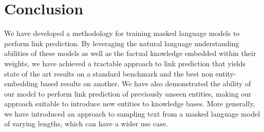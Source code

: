 \documentclass[11pt,a4paper]{article}
\begin{document}
\section{Conclusion}
We have developed a methodology for training masked language models to perform link prediction. 
By leveraging the natural language understanding abilities of these models as well as the factual knowledge embedded within their weights, we have achieved a tractable approach to link prediction that yields state of the art results on a standard benchmark and the best non entity-embedding based results on another.
We have also demonstrated the ability of our model to perform link prediction of previously unseen entities, making our approach suitable to introduce new entities to knowledge bases.
More generally, we have introduced an approach to sampling text from a masked language model of varying lengths, which can have a wider use case.
\clearpage

\nocite{HuggingFace}
\nocite{pytorch}


\end{document}
